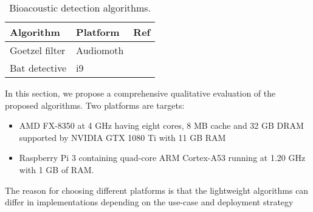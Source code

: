 \begin{table}
\small
\centering
\caption{Bioacoustic detection algorithms.}
\label{biodetect}
\begin{tabular}{lll}
\toprule
Algorithm & Platform & Ref \\
\midrule
Goetzel filter & Audiomoth & \cite{Prince2019} \\
Bat detective & i9 & \cite{MacAodha2018} \\
\bottomrule
\end{tabular}
\end{table}


In this section, we propose a comprehensive qualitative evaluation of the proposed algorithms. Two platforms are targets:
\begin{itemize}
\item AMD FX-8350 at 4 GHz having eight cores, 8 MB cache and 32 GB DRAM supported by NVIDIA GTX 1080 Ti with 11 GB RAM
\item Raspberry Pi 3 containing quad-core ARM Cortex-A53 running at 1.20 GHz with 1 GB of RAM.
\end{itemize}

\noindent The reason for choosing different platforms is that the lightweight algorithms can differ in implementations depending on the use-case and deployment strategy
